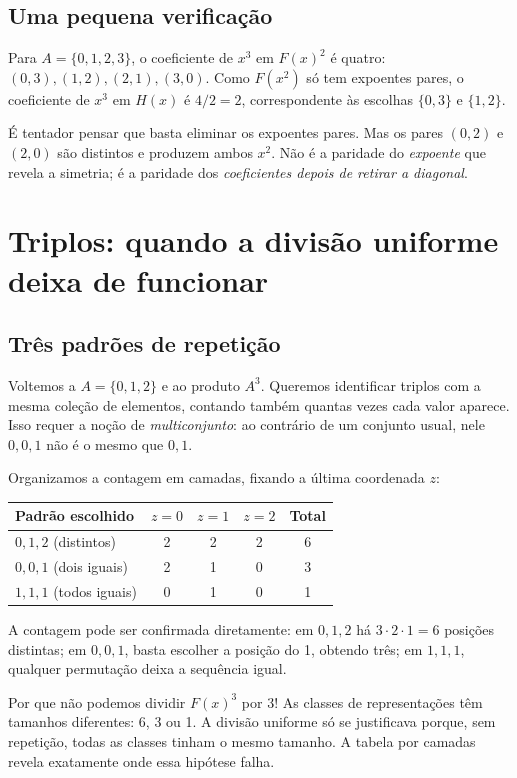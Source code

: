 \documentclass[11pt,a4paper,oneside]{book}
\begin{document}
\section{Uma pequena verificação}
Para $A=\{0,1,2,3\}$, o coeficiente de $x^3$ em $F(x)^2$ é quatro: $(0,3),(1,2),(2,1),(3,0)$. Como $F(x^2)$ só tem expoentes pares, o coeficiente de $x^3$ em $H(x)$ é $4/2=2$, correspondente às escolhas $\{0,3\}$ e $\{1,2\}$.

É tentador pensar que basta eliminar os expoentes pares. Mas os pares $(0,2)$ e $(2,0)$ são distintos e produzem ambos $x^2$. Não é a paridade do \emph{expoente} que revela a simetria; é a paridade dos \emph{coeficientes depois de retirar a diagonal}.

\chapter{Triplos: quando a divisão uniforme deixa de funcionar}
\section{Três padrões de repetição}
Voltemos a $A=\{0,1,2\}$ e ao produto $A^3$. Queremos identificar triplos com a mesma coleção de elementos, contando também quantas vezes cada valor aparece. Isso requer a noção de \emph{multiconjunto}: ao contrário de um conjunto usual, nele $0,0,1$ não é o mesmo que $0,1$.

Organizamos a contagem em camadas, fixando a última coordenada $z$:
\begin{center}
\begin{tabular}{l|ccc|c}
Padrão escolhido & $z=0$ & $z=1$ & $z=2$ & Total\\\midrule
$0,1,2$ (distintos) &2&2&2&6\\
$0,0,1$ (dois iguais) &2&1&0&3\\
$1,1,1$ (todos iguais)&0&1&0&1
\end{tabular}
\end{center}
A contagem pode ser confirmada diretamente: em $0,1,2$ há $3\cdot2\cdot1=6$ posições distintas; em $0,0,1$, basta escolher a posição do 1, obtendo três; em $1,1,1$, qualquer permutação deixa a sequência igual.
\begin{descobertabox}{Por que não podemos dividir $F(x)^3$ por $3!$}
As classes de representações têm tamanhos diferentes: 6, 3 ou 1. A divisão uniforme só se justificava porque, sem repetição, todas as classes tinham o mesmo tamanho. A tabela por camadas revela exatamente onde essa hipótese falha.
\end{descobertabox}
\end{document}
